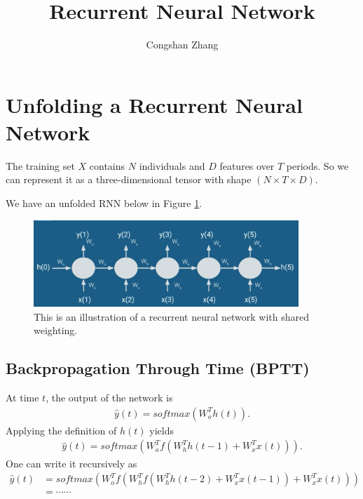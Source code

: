 \documentclass[letterpaper,12pt]{article}
\begin{document}
 
	\title{Recurrent Neural Network}
	\author{Congshan Zhang}
	\date{}
	\maketitle
\section{Unfolding a Recurrent Neural Network}
The training set $X$ contains $N$ individuals and $D$ features over $T$ periods. So we can represent it as a three-dimensional tensor with shape $(N\times T\times D)$.

We have an unfolded RNN below in Figure \ref{fig:rnn}.
\begin{figure}[H]
	\begin{center}
		\includegraphics[width=10cm,clip]{rnn.png}
	\end{center}
	\caption{This is an illustration of a recurrent neural network with shared weighting.}\label{fig:rnn}
\end{figure}

\subsection{Backpropagation Through Time (BPTT)}

At time $t$, the output of the network is 
\begin{align}
\hat{y}(t) = softmax\left(W_o^Th(t)\right).
\end{align}
Applying the definition of $h(t)$ yields
\begin{align}
\hat{y}(t) = softmax\left(W_o^T f\left( W_h^T h(t-1) + W_x^Tx(t) \right)\right).
\end{align}
One can write it recursively as
\begin{align}
\hat{y}(t) &= softmax\left(W_o^T f\left( W_h^T f\left(W_h^T h(t-2) + W_x^Tx(t-1)\right) + W_x^Tx(t) \right)\right)\nonumber\\
& = \cdots\cdots
\end{align}




\clearpage


\end{document}
